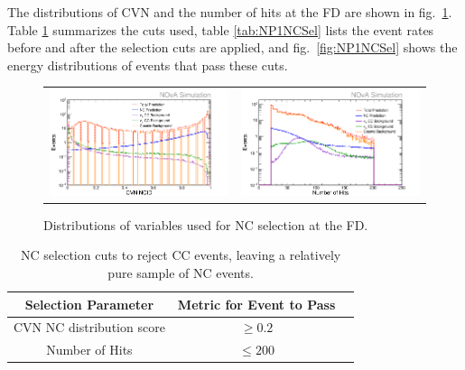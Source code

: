 The distributions of CVN and the number of hits at the FD are shown in fig.~\ref{fig:NCSel}. Table \ref{tab:NCSel} summarizes the cuts used, table \ref{tab:NP1NCSel} lists the event rates before and after the selection cuts are applied, and fig.~\ref{fig:NP1NCSel} shows the energy distributions of events that pass these cuts.
\begin{figure}[h]
  \centering
  \begin{tabular}{c c}
    \includegraphics[width=.48\textwidth]{figures/NP1CVNC.png} &
    \includegraphics[width=.48\textwidth]{figures/NP1NHit.png} \\
  \end{tabular}
  \caption[NC Selection Variable Distributions]{Distributions of variables used for NC selection at the FD.}
  \label{fig:NCSel}
\end{figure}

\begin{table}[h]
  \begin{center}
    \caption[NC Selection Cuts]{NC selection cuts to reject CC events, leaving a relatively pure sample of NC events.}
    \label{tab:NCSel}
    \begin{tabular}{c c c}
      \hline\hline
      Selection Parameter & Metric for Event to Pass \\
      \hline
      CVN NC distribution score & $\geq 0.2$ \\
      Number of Hits & $\leq 200$ \\
      \hline
    \end{tabular}
  \end{center}
\end{table}

